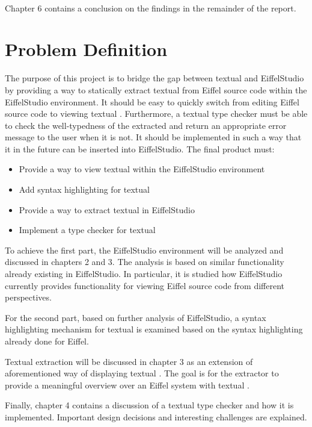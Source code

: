 \paragraph{}
Chapter 6 contains a conclusion on the findings in the remainder of the report.

\section{Problem Definition}
The purpose of this project is to bridge the gap between textual \bon{} and EiffelStudio by providing a way to statically extract textual \bon{} from Eiffel source code within the EiffelStudio environment. It should be easy to quickly switch from editing Eiffel source code to viewing textual \bon. Furthermore, a textual \bon{} type checker must be able to check the well-typedness of the extracted \bon{} and return an appropriate error message to the user when it is not. It should be implemented in such a way that it in the future can be inserted into EiffelStudio. The final product must:
\begin{itemize}
  \item Provide a way to view textual \bon{} within the EiffelStudio environment
  \item Add syntax highlighting for textual \bon{}
  \item Provide a way to extract textual \bon{} in EiffelStudio
  \item Implement a type checker for textual \bon{} 
\end{itemize}
To achieve the first part, the EiffelStudio environment will be analyzed and discussed in chapters 2 and 3. The analysis is based on similar functionality already existing in EiffelStudio. In particular, it is studied how EiffelStudio currently provides functionality for viewing Eiffel source code from different perspectives.

For the second part, based on further analysis of EiffelStudio, a syntax highlighting mechanism for textual \bon{} is examined based on the syntax highlighting already done for Eiffel. 

Textual \bon{} extraction will be discussed in chapter 3 as an extension of aforementioned way of displaying textual \bon. The goal is for the extractor to provide a meaningful overview over an Eiffel system with textual \bon{}.

Finally, chapter 4 contains a discussion of a textual \bon{} type checker and how it is implemented. Important design decisions and interesting challenges are explained.

